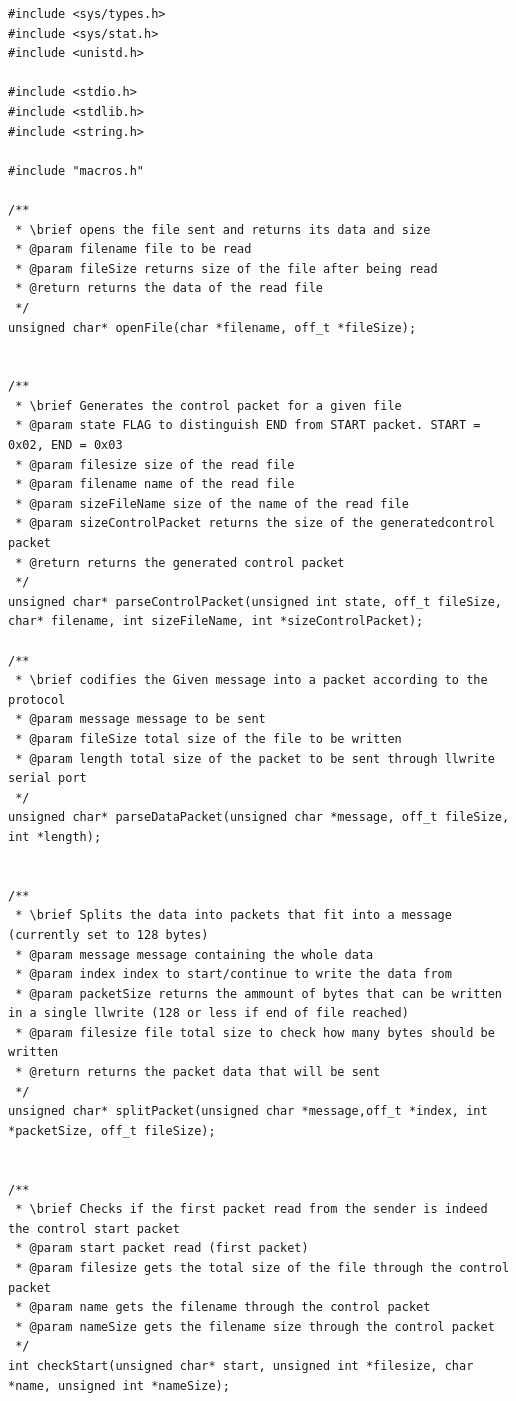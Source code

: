 \documentclass[11pt]{article}
\begin{document}
\begin{lstlisting}[style=CStyle]
#include <sys/types.h>
#include <sys/stat.h>
#include <unistd.h>

#include <stdio.h>
#include <stdlib.h>
#include <string.h>

#include "macros.h"

/**
 * \brief opens the file sent and returns its data and size
 * @param filename file to be read
 * @param fileSize returns size of the file after being read
 * @return returns the data of the read file
 */
unsigned char* openFile(char *filename, off_t *fileSize);


/**
 * \brief Generates the control packet for a given file
 * @param state FLAG to distinguish END from START packet. START = 0x02, END = 0x03
 * @param filesize size of the read file
 * @param filename name of the read file
 * @param sizeFileName size of the name of the read file
 * @param sizeControlPacket returns the size of the generatedcontrol packet
 * @return returns the generated control packet
 */
unsigned char* parseControlPacket(unsigned int state, off_t fileSize, char* filename, int sizeFileName, int *sizeControlPacket);

/**
 * \brief codifies the Given message into a packet according to the protocol
 * @param message message to be sent
 * @param fileSize total size of the file to be written
 * @param length total size of the packet to be sent through llwrite serial port
 */
unsigned char* parseDataPacket(unsigned char *message, off_t fileSize, int *length);


/**
 * \brief Splits the data into packets that fit into a message (currently set to 128 bytes)
 * @param message message containing the whole data
 * @param index index to start/continue to write the data from
 * @param packetSize returns the ammount of bytes that can be written in a single llwrite (128 or less if end of file reached)
 * @param filesize file total size to check how many bytes should be written
 * @return returns the packet data that will be sent
 */
unsigned char* splitPacket(unsigned char *message,off_t *index, int *packetSize, off_t fileSize);


/**
 * \brief Checks if the first packet read from the sender is indeed the control start packet
 * @param start packet read (first packet)
 * @param filesize gets the total size of the file through the control packet
 * @param name gets the filename through the control packet
 * @param nameSize gets the filename size through the control packet
 */
int checkStart(unsigned char* start, unsigned int *filesize, char *name, unsigned int *nameSize);



\end{lstlisting}
\end{document}
